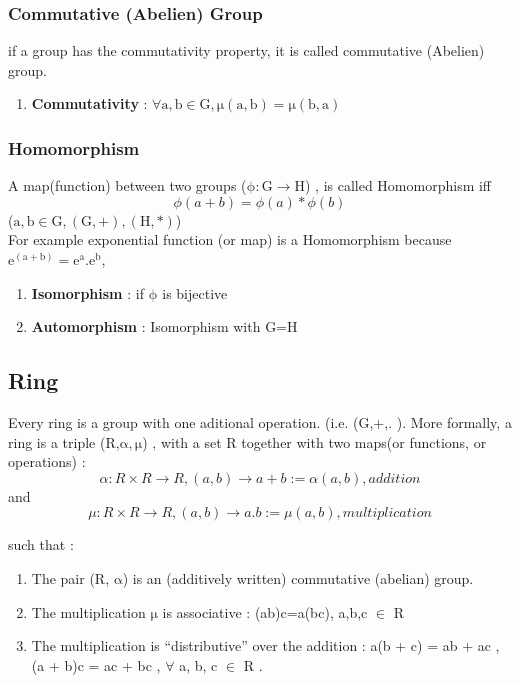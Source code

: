 \documentclass[11pt]{article}
\begin{document}
  
\subsubsection{Commutative (Abelien) Group} 
if a group has the commutativity property, it is called commutative (Abelien) group.

\begin{enumerate}
\item \textbf{Commutativity} : $\mathrm{\forall a,b \in G, \mu(a,b)=\mu(b,a)}$
\end{enumerate}

\subsubsection{Homomorphism} 
A map(function) between two groups ($\mathrm{\phi : G \rightarrow H }$) , is called Homomorphism iff 
\begin{equation}
 \phi(a+b)=\phi(a)*\phi(b) 
\end{equation}     
($\mathrm{a, b \in G, (G,+) , (H,*)}$)\\
For example exponential function (or map) is a Homomorphism because $\mathrm{e^{(a+b)}=e^a.e^b}$,  
\begin{enumerate}
\item \textbf{Isomorphism}  : if $\mathrm{\phi}$ is bijective
\item \textbf{Automorphism} : Isomorphism with G=H
\end{enumerate}


\subsection{Ring} 
Every ring is a group with one aditional operation. (i.e. (G,+,. ). More formally, a ring is a triple (R,$\mathrm{\alpha,\mu}$) , with a set R together with two maps(or functions, or operations) :
\begin{equation}
 \alpha : R \times R \rightarrow R, (a,b) \rightarrow a+b:=\alpha(a,b), addition
\end{equation}     
 and
\begin{equation}
 \mu : R \times R \rightarrow R, (a,b) \rightarrow a.b:=\mu(a,b), multiplication
\end{equation}     

such that :
\begin{enumerate}
\item The pair (R, $\mathrm{\alpha}$) is an (additively written) commutative (abelian) group.
\item The multiplication $\mathrm{\mu}$ is associative :  (ab)c=a(bc), a,b,c $\mathrm{\in}$ R
\item The multiplication is “distributive” over the addition : a(b + c) = ab + ac , (a + b)c = ac + bc , $\mathrm{\forall}$ a, b, c   $\mathrm{\in}$ R .
\end{enumerate}
\end{document}
